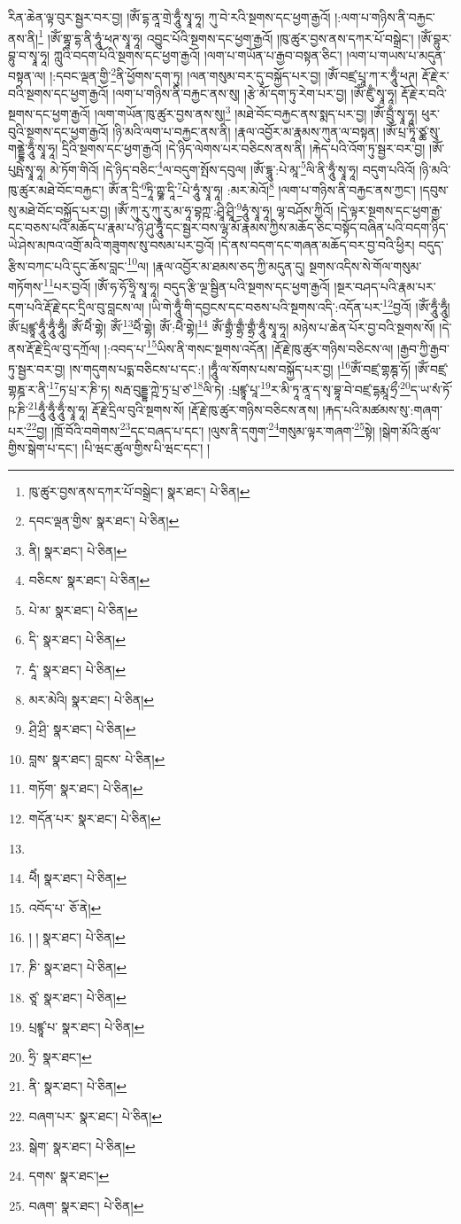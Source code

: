 རིན་ཆེན་ལྟ་བུར་སྦྱར་བར་བྱ། །ཨོཾ་དྷ་ནཱ་གྲེ་ཧཱུྃ་སྭཱ་ཧཱ། ཀུ་བེ་རའི་སྔགས་དང་ཕྱག་རྒྱའོ། །:ལག་པ་གཉིས་ནི་བརྐྱང་ནས་ནི།\footnote{ཁུ་ཚུར་བྱས་ནས་དཀར་པོ་བསྒྲེང་།  སྣར་ཐང་།  པེ་ཅིན། } །ཨོཾ་གྷཱ་དྷ་ནི་ཧཱུཾ་ཕཊ་སྭཱ་ཧཱ། འབྱུང་པོའི་སྔགས་དང་ཕྱག་རྒྱའོ། །ཁུ་ཚུར་བྱས་ནས་དཀར་པོ་བསྒྲེང་། །ཨོཾ་བྷུར་བྷུ་བ་སྭཱ་ཧཱ། ཀླུའི་བདག་པོའི་སྔགས་དང་ཕྱག་རྒྱའོ། །ལག་པ་གཡོན་པ་རྒྱབ་བསྟན་ཅིང་། །ལག་པ་གཡས་པ་མདུན་བསྟན་ལ། །:དབང་ལྡན་གྱི་\footnote{དབང་ལྡན་གྱིས་  སྣར་ཐང་།  པེ་ཅིན། }ནི་ཕྱོགས་དག་ཏུ། །ལན་གསུམ་བར་དུ་བསྐྱོད་པར་བྱ། །ཨོཾ་བཛྲ་པྲཱ་ཀ་ར་ཧཱུྃ་ཕཊ། རྡོ་རྗེ་ར་བའི་སྔགས་དང་ཕྱག་རྒྱའོ། །ལག་པ་གཉིས་ནི་བརྐྱང་ནས་སུ། །རྩེ་མོ་དག་ཏུ་རེག་པར་བྱ། །ཨོཾ་ཛུྃ་སྭཱ་ཧཱ། རྡོ་རྗེ་ར་བའི་སྔགས་དང་ཕྱག་རྒྱའོ། །ལག་གཡོན་ཁུ་ཚུར་བྱས་ནས་སུ།\footnote{ནི།  སྣར་ཐང་།  པེ་ཅིན། } །མཐེ་བོང་བརྐྱང་ནས་སྨད་པར་བྱ། །ཨོཾ་བྲུྃ་སྭཱ་ཧཱ། ཕུར་བུའི་སྔགས་དང་ཕྱག་རྒྱའོ། །ཉི་མའི་ལག་པ་བརྐྱང་ནས་ནི། །རྣལ་འབྱོར་མ་རྣམས་ཀུན་ལ་བསྟན། །ཨོཾ་པྲ་ཏཱི་ཙྪ་སུ་གནྡྷེ་ཧཱུྃ་སྭཱ་ཧཱ། དྲིའི་སྔགས་དང་ཕྱག་རྒྱའོ། །དེ་ཉིད་ལེགས་པར་བཅིངས་ནས་ནི། །རྐེད་པའི་འོག་ཏུ་སྦྱར་བར་བྱ། །ཨོཾ་པུཥྤེ་སྭཱ་ཧཱ། མེ་ཏོག་གིའོ། །དེ་ཉིད་བཅིང་\footnote{བཅིངས་  སྣར་ཐང་།  པེ་ཅིན། }ལ་བདུག་སྤོས་དབུལ། །ཨོཾ་དྷཱུ་:པེ་མཱ་\footnote{པེ་མ་  སྣར་ཐང་།  པེ་ཅིན། }ལི་ནི་ཧཱུྃ་སྭཱ་ཧཱ། བདུག་པའིའོ། །ཉི་མའི་ཁུ་ཚུར་མཐེ་བོང་བརྐྱང་། ཨོཾ་ན་དྲི་\footnote{དི་  སྣར་ཐང་།  པེ་ཅིན། }ཏཱི་ཀྵྞ་དཱི་\footnote{དཱཾ་  སྣར་ཐང་།  པེ་ཅིན། }པེ་ཧཱུཾ་སྭཱ་ཧཱ། :མར་མེའོ།\footnote{མར་མེའི།  སྣར་ཐང་།  པེ་ཅིན། } །ལག་པ་གཉིས་ནི་བརྐྱང་ནས་ཀྱང་། །དབུས་སུ་མཐེ་བོང་བསྐྱོད་པར་བྱ། །ཨོཾ་ཀུ་རུ་ཀུ་རུ་མ་ཧཱ་བྷཀྵ་:ཤྲཱི་ཤྲཱི་\footnote{ཤྲི་ཤྲི་  སྣར་ཐང་།  པེ་ཅིན། }ཧཱུཾ་སྭཱ་ཧཱ། ལྷ་བཤོས་ཀྱིའོ། །དེ་ལྟར་སྔགས་དང་ཕྱག་རྒྱ་དང་བཅས་པའི་མཆོད་པ་རྣམ་པ་ཉི་ཤུ་ཧཱུྃ་དང་སྦྱར་བས་ལྷ་མོ་རྣམས་ཀྱིས་མཆོད་ཅིང་བསྟོད་བཞིན་པའི་བདག་ཉིད་ཡེ་ཤེས་མཁའ་འགྲོ་མའི་གཟུགས་སུ་བསམ་པར་བྱའོ། །དེ་ནས་བདག་དང་གཞན་མཆོད་བར་བྱ་བའི་ཕྱིར། བདུད་རྩིས་བཀང་པའི་དུང་ཆོས་བླང་\footnote{བླས་  སྣར་ཐང་། བླངས་  པེ་ཅིན། }ལ། །རྣལ་འབྱོར་མ་ཐམས་ཅད་ཀྱི་མདུན་དུ། སྔགས་འདིས་སེ་གོལ་གསུམ་གཏོགས་\footnote{གཏོག་  སྣར་ཐང་།  པེ་ཅིན། }པར་བྱའོ། །ཨོཾ་ཧ་ཧོ་ཧྲཱི་སྭཱ་ཧཱ། བདུད་རྩི་ལྔ་སྦྱིན་པའི་སྔགས་དང་ཕྱག་རྒྱའོ། །སྔར་བཤད་པའི་རྣམ་པར་དག་པའི་རྡོ་རྗེ་དང་དྲིལ་བུ་བླངས་ལ། །ཡི་གེ་ཧཱུྃ་གི་དབྱངས་དང་བཅས་པའི་སྔགས་འདི་:འདོན་པར་\footnote{གདོན་པར་  སྣར་ཐང་།  པེ་ཅིན། }བྱའོ། །ཨོཾ་ཧཱུྃ་ཧཱུྃ། ཨོཾ་པྲཛྙཱ་ཧཱུྃ་ཧཱུྃ་ཧཱུྃ། ཨོཾ་ཕཻཾ་གྷེ། ཨོཾ་\footnote{}ཕཻཾ་གྷེ། ཨོཾ་:ཕཻཾ་གྷེ།\footnote{ཕཻཾ།  སྣར་ཐང་།  པེ་ཅིན། } ཨོཾ་གྷྲྃ་གྷྲྃ་གྷྲྃ་ཧཱུྃ་སྭཱ་ཧཱ། མཉེས་པ་ཆེན་པོར་བྱ་བའི་སྔགས་སོ། །དེ་ནས་རྡོ་རྗེ་དྲིལ་བུ་དཀྲོལ། །:འབད་པ་\footnote{འབོད་པ་  ཅོ་ནེ། }ཡིས་ནི་གསང་སྔགས་འདོན། །རྡོ་རྗེ་ཁུ་ཚུར་གཉིས་བཅིངས་ལ། །རྒྱབ་ཀྱི་རྒྱབ་ཏུ་སྦྱར་བར་བྱ། །ས་གདུགས་པདྨ་བཅིངས་པ་དང་:། །ཧཱུྃ་ལ་སོགས་པས་བསྐྱོད་པར་བྱ། །\footnote{། །  སྣར་ཐང་།  པེ་ཅིན། }ཨོཾ་བཛྲ་གྷཎྚ་ཧོ། །ཨོཾ་བཛྲ་གྷཎྜ་ར་ནི་\footnote{ཎི་  སྣར་ཐང་།  པེ་ཅིན། }ཏ་པྲ་ར་ཎི་ཏ། སརྦ་བུདྡྷ་ཀྵེ་ཏྲ་པྲ་ཙ་\footnote{ཙཱ་  སྣར་ཐང་།  པེ་ཅིན། }ལི་ཏེ། :པྲཛྙཱ་པཱ་\footnote{པྲཛྙཱ་པ་  སྣར་ཐང་།  པེ་ཅིན། }ར་མི་ཏཱ་ནཱ་ད་སྭ་བྷཱ་བེ་བཛྲ་དྷརྨཱ་ཧྲྀ་\footnote{ཧྲི་  སྣར་ཐང་། }ད་ཡ་སཾ་ཏོ་ཥ་ཎི་\footnote{ནི་  སྣར་ཐང་།  པེ་ཅིན། }ཧཱུྃ་ཧཱུྃ་ཧཱུྃ་སྭཱ་ཧཱ། རྡོ་རྗེ་དྲིལ་བུའི་སྔགས་སོ། །རྡོ་རྗེ་ཁུ་ཚུར་གཉིས་བཅིངས་ནས། །རྐད་པའི་མཚམས་སུ་:གཞག་པར་\footnote{བཞག་པར་  སྣར་ཐང་།  པེ་ཅིན། }བྱ། །ཁྲོ་བོའི་བགེགས་\footnote{སྒེག་  སྣར་ཐང་།  པེ་ཅིན། }དང་བཞད་པ་དང་། །ལུས་ནི་དགུག་\footnote{དགས་  སྣར་ཐང་། }གསུམ་ལྟར་གཞག་\footnote{བཞག་  སྣར་ཐང་།  པེ་ཅིན། }སྟེ། །སྒེག་མོའི་ཚུལ་གྱིས་སྒེག་པ་དང་། །པི་ཝང་ཚུལ་གྱིས་པི་ཝང་དང་། །

